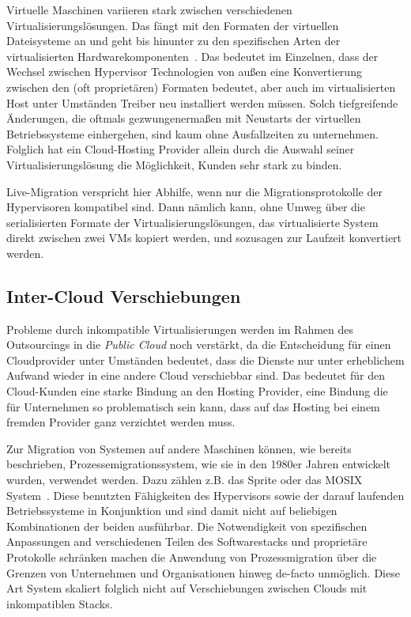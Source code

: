 Virtuelle Maschinen variieren stark zwischen verschiedenen
Virtualisierungslösungen. Das fängt mit den Formaten der virtuellen
Dateisysteme an und geht bis hinunter zu den spezifischen Arten der
virtualisierten Hardwarekomponenten~\cite{nelson2005fast}. Das
bedeutet im Einzelnen, dass der Wechsel zwischen Hypervisor
Technologien von außen eine Konvertierung zwischen den (oft
proprietären) Formaten bedeutet, aber auch im virtualisierten Host
unter Umständen Treiber neu installiert werden müssen. Solch
tiefgreifende Änderungen, die oftmals gezwungenermaßen mit Neustarts
der virtuellen Betriebssysteme einhergehen, sind kaum ohne
Ausfallzeiten zu unternehmen. Folglich hat ein Cloud-Hosting Provider
allein durch die Auswahl seiner Virtualisierungslösung die
Möglichkeit, Kunden sehr stark zu binden.

Live-Migration verspricht hier Abhilfe, wenn nur die
Migrationsprotokolle der Hypervisoren kompatibel sind. Dann nämlich
kann, ohne Umweg über die serialisierten Formate der
Virtualisierungslösungen, das virtualisierte System direkt zwischen
zwei VMs kopiert werden, und sozusagen zur Laufzeit konvertiert
werden.

\subsection{Inter-Cloud Verschiebungen}
\label{sec:movclouds}
Probleme durch inkompatible Virtualisierungen werden im Rahmen des
Outsourcings in die \emph{Public Cloud} noch verstärkt, da die
Entscheidung für einen Cloudprovider unter Umständen bedeutet, dass
die Dienste nur unter erheblichem Aufwand wieder in eine andere Cloud
verschiebbar sind. Das bedeutet für den Cloud-Kunden eine starke
Bindung an den Hosting Provider, eine Bindung die für Unternehmen so
problematisch sein kann, dass auf das Hosting bei einem fremden
Provider ganz verzichtet werden muss.

Zur Migration von Systemen auf andere Maschinen können, wie bereits
beschrieben, Prozessemigrationssystem, wie sie in den 1980er Jahren
entwickelt wurden, verwendet werden. Dazu zählen z.B. das Sprite oder
das MOSIX System~\cite{hansen2004self}. Diese benutzten Fähigkeiten
des Hypervisors sowie der darauf laufenden Betriebssysteme in
Konjunktion und sind damit nicht auf beliebigen Kombinationen der
beiden ausführbar. Die Notwendigkeit von spezifischen Anpassungen and
verschiedenen Teilen des Softwarestacks und proprietäre Protokolle
schränken machen die Anwendung von Prozessmigration über die Grenzen
von Unternehmen und Organisationen hinweg de-facto unmöglich. Diese
Art System skaliert folglich nicht auf Verschiebungen zwischen Clouds
mit inkompatiblen Stacks.

